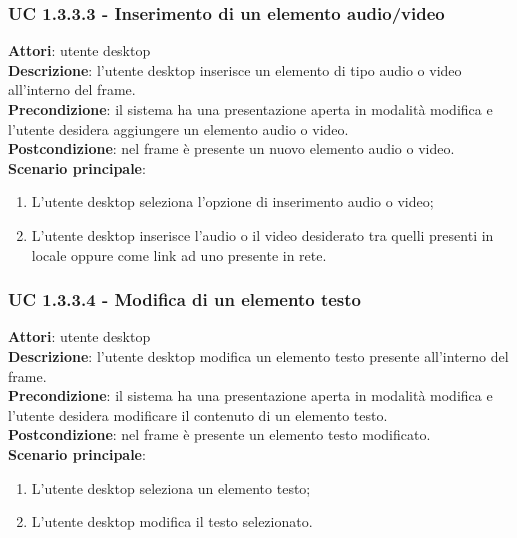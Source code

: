 \subsubsection{UC 1.3.3.3 - Inserimento di un elemento audio/video}{
	\label{uc1.3.3.3}
	\textbf{Attori}: utente desktop \\
	\textbf{Descrizione}: l'utente desktop inserisce un elemento di tipo audio o video all'interno del frame. \\
	\textbf{Precondizione}: il sistema ha una presentazione aperta in modalità modifica e l'utente desidera aggiungere un elemento audio o video.	\\
	\textbf{Postcondizione}: nel frame è presente un nuovo elemento audio o video.	\\
	\textbf{Scenario principale}:
	\begin{enumerate}
		\item L'utente desktop seleziona l'opzione di inserimento audio o video;
		\item L'utente desktop inserisce l'audio o il video desiderato tra quelli presenti in locale oppure come link ad uno presente in rete.
	\end{enumerate}
	}
\subsubsection{UC 1.3.3.4 - Modifica di un elemento testo}{
	\label{uc1.3.3.4}
	\textbf{Attori}: utente desktop \\
	\textbf{Descrizione}: l'utente desktop modifica un elemento testo presente all'interno del frame. \\
	\textbf{Precondizione}: il sistema ha una presentazione aperta in modalità modifica e l'utente desidera modificare il contenuto di un elemento testo.	\\
	\textbf{Postcondizione}: nel frame è presente un elemento testo modificato.	\\
	\textbf{Scenario principale}:
	\begin{enumerate}
		\item L'utente desktop seleziona un elemento testo;
		\item L'utente desktop modifica il testo selezionato.
	\end{enumerate}
	}
